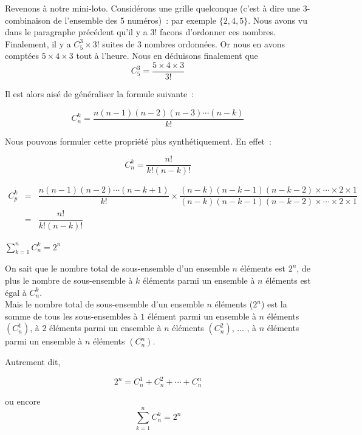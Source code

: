 \documentclass[french]{book}
\newcommand{\co}[2]{C_#2^#1}
\begin{document}
Revenons à notre mini-loto. Considérons une grille quelconque
(c'est à dire une 3-combinaison de l'ensemble des 5 numéros)~: par
exemple $\{2,4,5\}$. Nous  avons vu dans le paragraphe précédent
qu'il y a $3!$ facons d'ordonner ces nombres. Finalement, il y a
$\co{3}{5} \times 3!$ suites de 3 nombres ordonnées. Or nous en
avons comptées $5\times 4\times 3$ tout à l'heure. Nous en
déduisons finalement que
$$\co{3}{5}  =\dfrac{5\times 4\times 3}{3!}$$

Il est alors aisé de généraliser la formule suivante~:


\begin{prop}[]
  $$\co{k}{n}=\dfrac{n(n-1)(n-2)(n-3)\cdots(n-k)}{k!}$$
\end{prop}



Nous pouvons formuler cette propriété plus synthétiquement. En
effet~:




\begin{thm}[]
   $$\co{k}{n}=\dfrac{n!}{k!(n-k)!}$$
\end{thm}

\begin{demo}
\begin{eqnarray*}
  {\co{k}{p}}&=&\dfrac{n(n-1)(n-2)\cdots(n-k+1)}{k!}\times
\dfrac{(n-k)(n-k-1)(n-k-2)\times\cdots\times 2\times
1}{(n-k)(n-k-1)(n-k-2)\times\cdots\times 2\times
1}\\
&=&\dfrac{n!}{k!(n-k)!}
\end{eqnarray*}
\end{demo}


\begin{prop}
$\sum^n_{k=1} \co{k}{n} =2^n$
\end{prop}

\begin{demo}

On sait que le nombre total de sous-ensemble d'un ensemble $n$ éléments est $2^n$, de plus le nombre de sous-ensemble à $k$ éléments parmi un ensemble à $n$ éléments est égal à $\co{k}{n}$. \\ 

Mais le nombre total de sous-ensemble d'un ensemble $n$ éléments ($2^n$) est la somme de tous les sous-ensembles à $1$ élément parmi un ensemble à $n$ éléments $(\co{1}{n})$, à $2$ éléments parmi un ensemble à $n$ éléments  $(\co{2}{n})$, ... , à $n$ éléments parmi un ensemble à $n$ éléments  $ (\co{n}{n})$. 

Autrement dit, 

$$ 2^n= \co{1}{n} + \co{2}{n} + \cdots +  \co{n}{n} $$

ou encore 
$$\sum^n_{k=1}  \co{k}{n} = 2^n $$
\end{demo}
 \newpage
\end{document}
